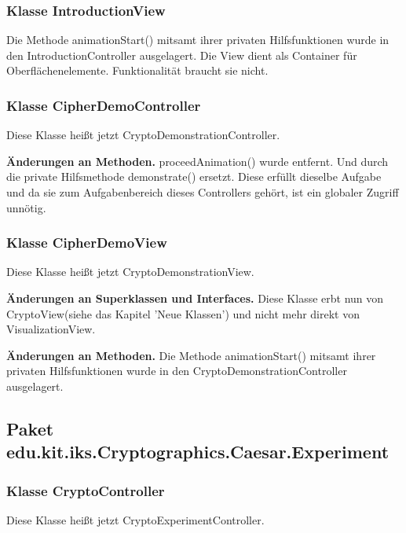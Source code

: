 \documentclass{article}
\begin{document}
       	  \subsubsection{Klasse IntroductionView}
            Die Methode animationStart() mitsamt ihrer privaten Hilfsfunktionen wurde in den IntroductionController ausgelagert.
            Die View dient als Container für Oberflächenelemente. Funktionalität braucht sie nicht.
	  \subsubsection{Klasse CipherDemoController}
            Diese Klasse heißt jetzt CryptoDemonstrationController.\newline
         
           \textbf{Änderungen an Methoden.}\newline
            proceedAnimation() wurde entfernt. Und durch die private Hilfsmethode demonstrate() ersetzt.
            Diese erfüllt dieselbe Aufgabe und da sie zum Aufgabenbereich dieses Controllers gehört, 
            ist ein globaler Zugriff unnötig.

	\subsubsection{Klasse CipherDemoView}
	   Diese Klasse heißt jetzt CryptoDemonstrationView.\newline
	   
	    \textbf{Änderungen an Superklassen und Interfaces.}\newline
	     Diese Klasse erbt nun von CryptoView(siehe das Kapitel 'Neue Klassen') und nicht mehr direkt von VisualizationView.\newline
	   
	    \textbf{Änderungen an Methoden.}\newline
	     Die Methode animationStart() mitsamt ihrer privaten Hilfsfunktionen wurde in den CryptoDemonstrationController ausgelagert.

  \subsection{Paket edu.kit.iks.Cryptographics.Caesar.Experiment}

	\subsubsection{Klasse CryptoController}
          Diese Klasse heißt jetzt CryptoExperimentController.\newline
          
\end{document}

